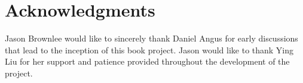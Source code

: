 % 
% 
\section*{Acknowledgments}
Jason Brownlee would like to sincerely thank Daniel Angus for early discussions that lead to the inception of this book project.
Jason would like to thank Ying Liu for her support and patience provided throughout the development of the project. 